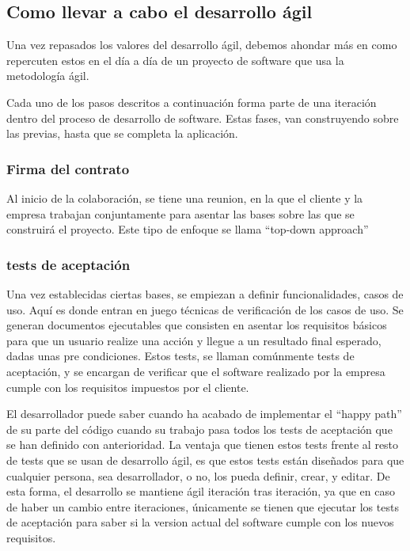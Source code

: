 \documentclass[12pt]{report} %
\begin{document}
\subsection{Como llevar a cabo el desarrollo ágil}

Una vez repasados los valores del desarrollo ágil, debemos ahondar más en como
repercuten estos en el día a día de un proyecto de software que usa la
metodología ágil.

Cada uno de los pasos descritos a continuación forma parte de una iteración
dentro del proceso de desarrollo de software.  Estas fases, van construyendo
sobre las previas, hasta que se completa la aplicación.

\subsubsection{Firma del contrato}

Al inicio de la colaboración, se tiene una reunion, en la que el cliente y la
empresa trabajan conjuntamente para asentar las bases sobre las que se
construirá el proyecto.  Este tipo de enfoque se llama ``top-down approach''

\subsubsection{tests de aceptación}

Una vez establecidas ciertas bases, se empiezan a definir funcionalidades, casos
de uso.  Aquí es donde entran en juego técnicas de verificación de los casos de
uso.  Se generan documentos ejecutables que consisten en asentar los requisitos
básicos para que un usuario realize una acción y llegue a un resultado final
esperado, dadas unas pre condiciones.  Estos tests, se llaman comúnmente tests
de aceptación, y se encargan de verificar que el software realizado por la
empresa cumple con los requisitos impuestos por el cliente.

El desarrollador puede saber cuando ha acabado de implementar el ``happy path''
de su parte del código cuando su trabajo pasa todos los tests de aceptación que
se han definido con anterioridad.  La ventaja que tienen estos tests frente al
resto de tests que se usan de desarrollo ágil, es que estos tests están
diseñados para que cualquier persona, sea desarrollador, o no, los pueda
definir, crear, y editar.  De esta forma, el desarrollo se mantiene ágil
iteración tras iteración, ya que en caso de haber un cambio entre iteraciones,
únicamente se tienen que ejecutar los tests de aceptación para saber si la
version actual del software cumple con los nuevos requisitos.
\end{document}

